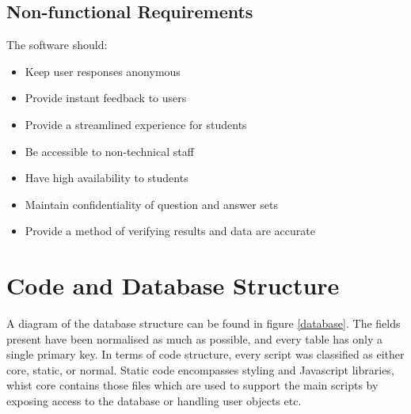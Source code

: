 \documentclass[12pt,a4paper,twoside]{report}
\begin{document}
\subsection{Non-functional Requirements}
The software should:
\begin{itemize}
	\item Keep user responses anonymous
	\item Provide instant feedback to users
	\item Provide a streamlined experience for students
	\item Be accessible to non-technical staff
	\item Have high availability to students
	\item Maintain confidentiality of question and answer sets
	\item Provide a method of verifying results and data are accurate
\end{itemize}

\section{Code and Database Structure}
A diagram of the database structure can be found in figure \ref{database}. The fields present have been normalised as much as possible, and every table has only a single primary key. In terms of code structure, every script was classified as either core, static, or normal. Static code encompasses styling and Javascript libraries, whist core contains those files which are used to support the main scripts by exposing access to the database or handling user objects etc.
\end{document}
